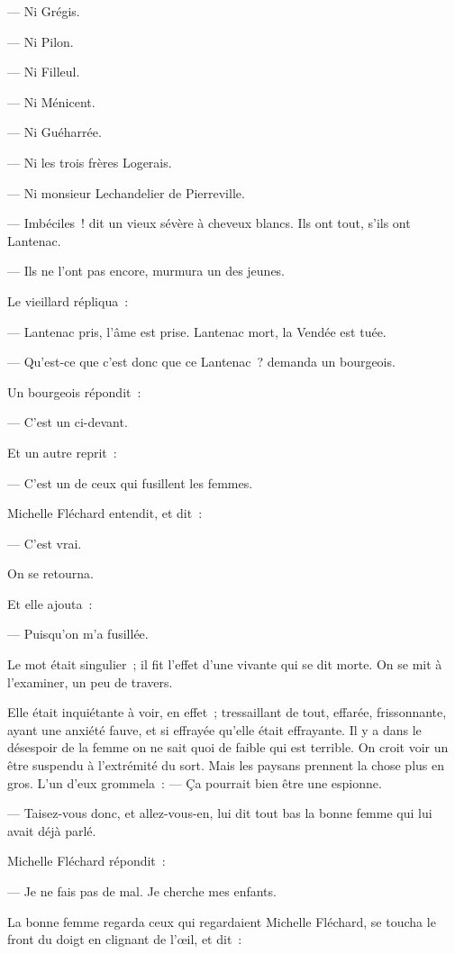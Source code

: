 \documentclass[french,twoside]{book} %
\begin{document}
— Ni Grégis.\par
— Ni Pilon.\par
— Ni Filleul.\par
— Ni Ménicent.\par
— Ni Guéharrée.\par
— Ni les trois frères Logerais.\par
— Ni monsieur Lechandelier de Pierreville.\par
— Imbéciles ! dit un vieux sévère à cheveux blancs. Ils ont tout, s’ils ont Lantenac.\par
— Ils ne l’ont pas encore, murmura un des jeunes.\par
Le vieillard répliqua :\par
— Lantenac pris, l’âme est prise. Lantenac mort, la Vendée est tuée.\par
 — Qu’est-ce que c’est donc que ce Lantenac ? demanda un bourgeois.\par
Un bourgeois répondit :\par
— C’est un ci-devant.\par
Et un autre reprit :\par
— C’est un de ceux qui fusillent les femmes.\par
Michelle Fléchard entendit, et dit :\par
— C’est vrai.\par
On se retourna.\par
Et elle ajouta :\par
— Puisqu’on m’a fusillée.\par
Le mot était singulier ; il fit l’effet d’une vivante qui se dit morte. On se mit à l’examiner, un peu de travers.\par
Elle était inquiétante à voir, en effet ; tressaillant de tout, effarée, frissonnante, ayant une anxiété fauve, et si effrayée qu’elle était effrayante. Il y a dans le désespoir de la femme on ne sait quoi de faible qui est terrible. On croit voir un être suspendu à l’extrémité du sort. Mais les paysans prennent la chose plus en gros. L’un d’eux grommela : — Ça pourrait bien être une espionne.\par
— Taisez-vous donc, et allez-vous-en, lui dit tout bas la bonne femme qui lui avait déjà parlé.\par
Michelle Fléchard répondit :\par
— Je ne fais pas de mal. Je cherche mes enfants.\par
La bonne femme regarda ceux qui regardaient Michelle Fléchard, se toucha le front du doigt en clignant de l’œil, et dit :\par
\end{document}

